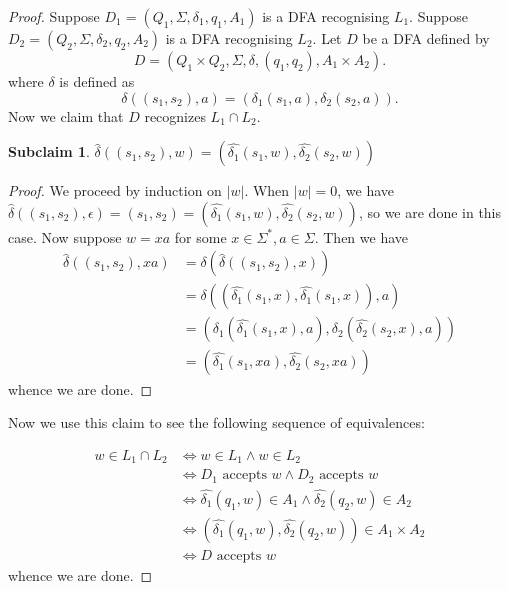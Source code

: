 \documentclass[a4paper]{article}
\newtheorem{subclaim}{Subclaim}
\begin{document}
\begin{proof}
    Suppose $D_1 = (Q_1, \Sigma, \delta_1, q_1, A_1)$ is a DFA recognising $L_1$.
    Suppose $D_2 = (Q_2, \Sigma, \delta_2, q_2, A_2)$ is a DFA recognising $L_2$.
    Let $D$ be a DFA defined by 
    \[
        D = (Q_1 \times Q_2, \Sigma, \delta, (q_1, q_2), A_1 \times A_2)
    .\] 
    where $\delta$ is defined as
    \[
        \delta((s_1, s_2), a) = (\delta_1(s_1, a), \delta_2(s_2, a))
    .\] 
    Now we claim that $D$ recognizes $L_1 \cap L_2$.
    \begin{subclaim}
        $\hat{\delta}((s_1, s_2), w) = (\hat{\delta_1}(s_1, w), \hat{\delta_2}(s_2, w))$
    \end{subclaim}
    \begin{proof}
        We proceed by induction on $|w|$. When $|w| = 0$, we have $\hat{\delta}((s_1, s_2), \epsilon) = (s_1, s_2) = (\hat{\delta_1}(s_1, w), \hat{\delta_2}(s_2, w))$, so we are done in this
        case. Now suppose $w = xa$ for some $x \in \Sigma^*, a \in \Sigma$.
        Then we have
        \begin{align*}
            \hat{\delta}((s_1, s_2), xa) &= \delta(\hat{\delta}((s_1, s_2), x)) \\
                                  &= \delta((\hat{\delta_1}(s_1, x), \hat{\delta_1}(s_1, x)), a)\\
                                  &= (\delta_1(\hat{\delta_1}(s_1, x), a), \delta_2(\hat{\delta_2}(s_2, x), a))\\
                                  &= (\hat{\delta_1}(s_1, xa), \hat{\delta_2}(s_2, xa))
        \end{align*}
        whence we are done.
    \end{proof}
    Now we use this claim to see the following sequence of equivalences:

    \begin{align*}
        w \in L_1 \cap L_2 &\iff w \in L_1 \land w \in L_2\\
                    &\iff D_1 \text{ accepts } w \land D_2 \text{ accepts } w\\
                    &\iff \hat{\delta_1}(q_1, w) \in A_1 \land \hat{\delta_2}(q_2, w) \in A_2\\
                    &\iff (\hat{\delta_1}(q_1, w), \hat{\delta_2}(q_2, w)) \in A_1 \times A_2\\
                    &\iff D \text{ accepts } w
    \end{align*}
    whence we are done.
\end{proof}
\end{document}
